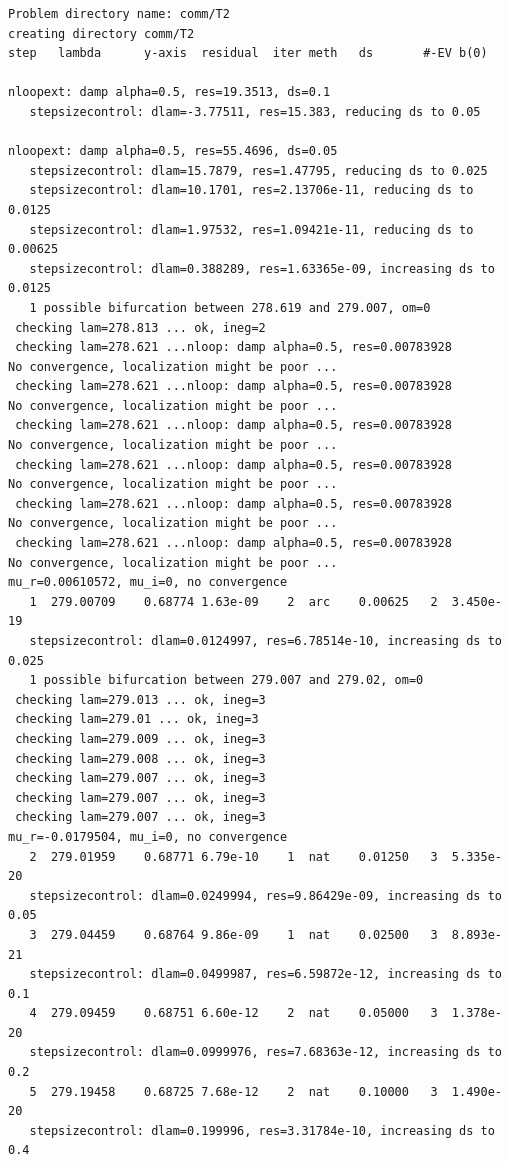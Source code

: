 \documentclass[a4paper,12pt]{article}
\begin{document}
\begin{verbatim}
Problem directory name: comm/T2
creating directory comm/T2
step   lambda      y-axis  residual  iter meth   ds       #-EV b(0)       

nloopext: damp alpha=0.5, res=19.3513, ds=0.1
   stepsizecontrol: dlam=-3.77511, res=15.383, reducing ds to 0.05

nloopext: damp alpha=0.5, res=55.4696, ds=0.05
   stepsizecontrol: dlam=15.7879, res=1.47795, reducing ds to 0.025
   stepsizecontrol: dlam=10.1701, res=2.13706e-11, reducing ds to 0.0125
   stepsizecontrol: dlam=1.97532, res=1.09421e-11, reducing ds to 0.00625
   stepsizecontrol: dlam=0.388289, res=1.63365e-09, increasing ds to 0.0125
   1 possible bifurcation between 278.619 and 279.007, om=0
 checking lam=278.813 ... ok, ineg=2
 checking lam=278.621 ...nloop: damp alpha=0.5, res=0.00783928
No convergence, localization might be poor ...
 checking lam=278.621 ...nloop: damp alpha=0.5, res=0.00783928
No convergence, localization might be poor ...
 checking lam=278.621 ...nloop: damp alpha=0.5, res=0.00783928
No convergence, localization might be poor ...
 checking lam=278.621 ...nloop: damp alpha=0.5, res=0.00783928
No convergence, localization might be poor ...
 checking lam=278.621 ...nloop: damp alpha=0.5, res=0.00783928
No convergence, localization might be poor ...
 checking lam=278.621 ...nloop: damp alpha=0.5, res=0.00783928
No convergence, localization might be poor ...
mu_r=0.00610572, mu_i=0, no convergence
   1  279.00709    0.68774 1.63e-09    2  arc    0.00625   2  3.450e-19 
   stepsizecontrol: dlam=0.0124997, res=6.78514e-10, increasing ds to 0.025
   1 possible bifurcation between 279.007 and 279.02, om=0
 checking lam=279.013 ... ok, ineg=3
 checking lam=279.01 ... ok, ineg=3
 checking lam=279.009 ... ok, ineg=3
 checking lam=279.008 ... ok, ineg=3
 checking lam=279.007 ... ok, ineg=3
 checking lam=279.007 ... ok, ineg=3
 checking lam=279.007 ... ok, ineg=3
mu_r=-0.0179504, mu_i=0, no convergence
   2  279.01959    0.68771 6.79e-10    1  nat    0.01250   3  5.335e-20 
   stepsizecontrol: dlam=0.0249994, res=9.86429e-09, increasing ds to 0.05
   3  279.04459    0.68764 9.86e-09    1  nat    0.02500   3  8.893e-21 
   stepsizecontrol: dlam=0.0499987, res=6.59872e-12, increasing ds to 0.1
   4  279.09459    0.68751 6.60e-12    2  nat    0.05000   3  1.378e-20 
   stepsizecontrol: dlam=0.0999976, res=7.68363e-12, increasing ds to 0.2
   5  279.19458    0.68725 7.68e-12    2  nat    0.10000   3  1.490e-20 
   stepsizecontrol: dlam=0.199996, res=3.31784e-10, increasing ds to 0.4

\end{verbatim}
\end{document}
